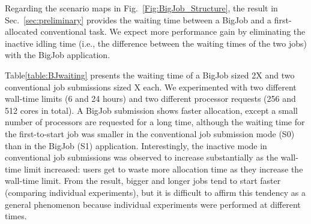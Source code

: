 \documentclass[preprint,12pt]{elsarticle}
\begin{document}
Regarding the scenario maps in Fig.~\ref{Fig:BigJob_Structure}, the result in Sec.~\ref{sec:preliminary} provides the waiting time between a BigJob and a first-allocated conventional task. We expect more performance gain by eliminating the inactive idling time (i.e., the difference between the waiting times of the two jobs) with the BigJob application. 


Table\ref{table:BJwaiting}  presents the waiting time of a BigJob sized 2X and two conventional job submissions sized X each. We experimented with two different wall-time limits (6 and 24 hours) and two different processor requests (256 and 512 cores in total). A BigJob submission shows faster allocation, except a small number of processors are requested for a long time, although the waiting time for the first-to-start job was smaller in the conventional job submission mode (S0) than in the BigJob (S1) application. Interestingly, the inactive mode in conventional job submissions was observed to increase substantially as the wall-time limit increased: users get to waste more allocation time as they increase the wall-time limit. From the result, bigger and longer jobs tend to start faster (comparing individual experiments), but it is difficult to affirm this tendency as a general phenomenon because individual experiments were performed at different times.
\end{document}
